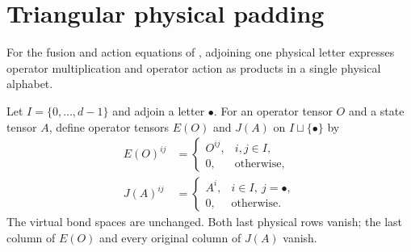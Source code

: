 
\section{Triangular physical padding}
\label{sec:glm_triangular_padding}

For the fusion and action equations of
\cite[Section~2]{GarreRubio2023MPOSym}, adjoining one physical letter
expresses operator multiplication and operator action as products in a
single physical alphabet.

\begin{definition}
    \leanok
    \label{def:glm_triangular_padding}
    Let $I=\{0,\ldots,d-1\}$ and adjoin a letter $\bullet$.
    For an operator tensor $O$ and a state tensor $A$, define operator
    tensors $E(O)$ and $J(A)$ on $I\sqcup\{\bullet\}$ by
    \begin{align}
        E(O)^{ij}
         & =\begin{cases}O^{ij},&i,j\in I,\\0,&\text{otherwise},\end{cases}
        \label{eq:glm_padding_corner}                                              \\
        J(A)^{ij}
         & =\begin{cases}A^i,&i\in I,\ j=\bullet,\\0,&\text{otherwise}.\end{cases}
        \label{eq:glm_padding_column}
    \end{align}
    The virtual bond spaces are unchanged. Both last physical rows vanish;
    the last column of $E(O)$ and every original column of $J(A)$ vanish.
\end{definition}

